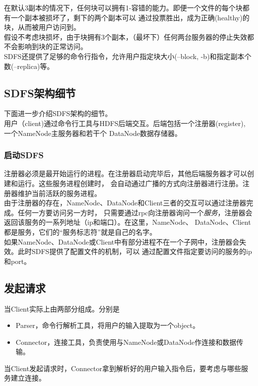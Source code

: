\documentclass[a4paper]{article}
\begin{document}
在默认3副本的情况下，任何块可以拥有1-容错的能力。即便一个文件的每个块都有一个副本被损坏了，剩下的两个副本可以
通过投票胜出，成为正确(healthy)的块，从而被用户访问到。\\

假设不考虑块损坏，由于块拥有3个副本，（最坏下）任何两台服务器的停止失效都不会影响到块的正常访问。\\

SDFS还提供了足够的命令行指令，允许用户指定块大小(--block, -b)和指定副本个数(--replica)等。

\subsection{SDFS架构细节}
下面进一步介绍SDFS架构的细节。\\

用户（client)通过命令行工具与HDFS后端交互。后端包括一个注册器(register), 一个NameNode主服务器和若干个
DataNode数据存储器。\\

\subsubsection{启动SDFS}
注册器必须是最开始运行的进程。在注册器启动完毕后，其他后端服务器才可以创建和运行。这些服务进程创建时，
会自动通过广播的方式向注册器进行注册。注册器维护当前活跃的服务进程。\\

由于注册器的存在，NameNode、DataNode和Client三者的交互可以通过注册器完成。任何一方要访问另一方时，
只需要通过rpc向注册器询问一个\emph{服务}，注册器会返回该服务的一系列地址（ip和端口）。在这里，NameNode、
DataNode、Client都是服务，它们的``服务标志符''就是自己的名字。\\

如果NameNode、DataNode或Client中有部分进程不在一个子网中，注册器会失效。此时SDFS提供了配置文件的机制，可以
通过配置文件指定要访问的服务的ip和port。
\subsection{发起请求}
当Client实际上由两部分组成。分别是
\begin{itemize}
    \item Parser，命令行解析工具，将用户的输入提取为一个object。
    \item Connector，连接工具，负责使用与NameNode或DataNode作连接和数据传输。
\end{itemize}
当Client发起请求时，Connector拿到解析好的用户输入指令后，要考虑与哪些服务建立连接。\\
\end{document}
